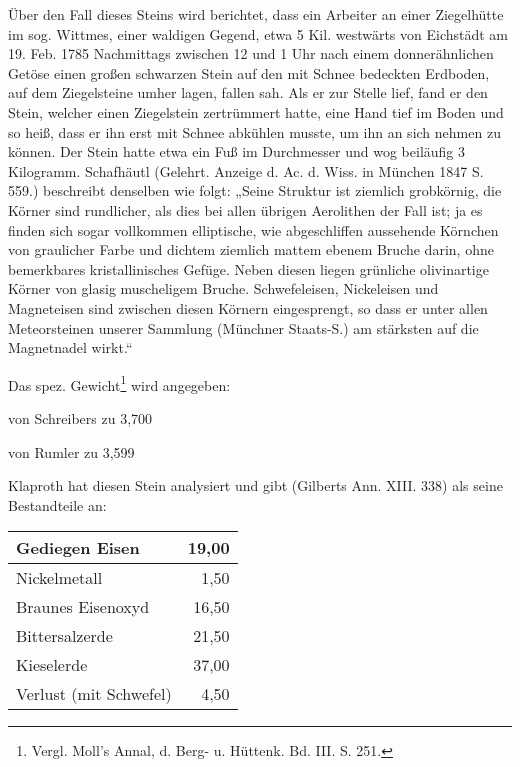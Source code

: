 \documentclass[a4paper, 11pt, oneside]{article}
\begin{document}
Über den Fall dieses Steins wird berichtet, dass ein Arbeiter an einer Ziegelhütte im sog. Wittmes, einer waldigen Gegend, etwa 5 Kil. westwärts von Eichstädt am 19. Feb. 1785 Nachmittags zwischen 12 und 1 Uhr nach einem donnerähnlichen Getöse einen großen schwarzen Stein auf den mit Schnee bedeckten Erdboden, auf dem Ziegelsteine umher lagen, fallen sah. Als er zur Stelle lief, fand er den Stein, welcher einen Ziegelstein zertrümmert hatte, eine Hand tief im Boden und so heiß, dass er ihn erst mit Schnee abkühlen musste, um ihn an sich nehmen zu können. Der Stein hatte etwa ein Fuß im Durchmesser und wog beiläufig 3 Kilogramm. Schafhäutl (Gelehrt. Anzeige d. Ac. d. Wiss. in München 1847 S. 559.) beschreibt denselben wie folgt: „Seine Struktur ist ziemlich grobkörnig, die Körner sind rundlicher, als dies bei allen übrigen Aerolithen der Fall ist; ja es finden sich sogar vollkommen elliptische, wie abgeschliffen aussehende Körnchen von graulicher Farbe und dichtem ziemlich mattem ebenem Bruche darin, ohne bemerkbares kristallinisches Gefüge. Neben diesen liegen grünliche olivinartige Körner von glasig muscheligem Bruche. Schwefeleisen, Nickeleisen und Magneteisen sind zwischen diesen Körnern eingesprengt, so dass er unter allen Meteorsteinen unserer Sammlung (Münchner Staats-S.) am stärksten auf die Magnetnadel wirkt.“

Das spez. Gewicht\footnote{Vergl. Moll's Annal, d. Berg- u. Hüttenk. Bd. III. S. 251.} wird angegeben:

von Schreibers zu 3,700

von Rumler zu 3,599

Klaproth hat diesen Stein analysiert und gibt (Gilberts Ann. XIII. 338) als seine Bestandteile an:
\begin{center}
    \begin{tabular}{ |l|r| } 
    \hline
    Gediegen Eisen & 19,00\\\hline
    Nickelmetall & 1,50\\\hline
    Braunes Eisenoxyd & 16,50\\\hline
    Bittersalzerde & 21,50\\\hline
    Kieselerde & 37,00\\\hline
    Verlust (mit Schwefel) & 4,50\\
    \hline
    \end{tabular}
\end{center}
\end{document}
